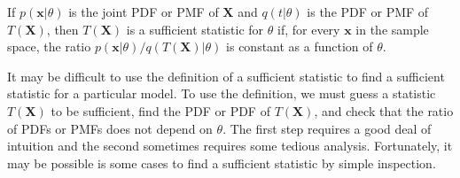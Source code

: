 \begin{theorem}
If $p(\mathbf{x}|\theta)$ is the joint PDF or PMF of $\mathbf{X}$ and $q(t|\theta)$ is the PDF or PMF of $T(\mathbf{X})$, then $T(\mathbf{X})$ is a sufficient statistic for $\theta$ if, for every $\mathbf{x}$ in the sample space, the ratio $p(\mathbf{x}|\theta)/q(T(\mathbf{X})|\theta)$ is constant as a function of $\theta$.
\end{theorem}

It may be difficult to use the definition of a sufficient statistic to find a sufficient statistic for a particular model.
To use the definition, we must guess a statistic $T(\mathbf{X})$ to be sufficient, find the PDF or PDF of $T(\mathbf{X})$, and check that the ratio of PDFs or PMFs does not depend on $\theta$.
The first step requires a good deal of intuition and the second sometimes requires some tedious analysis.
Fortunately, it may be possible is some cases to find a sufficient statistic by simple inspection.


